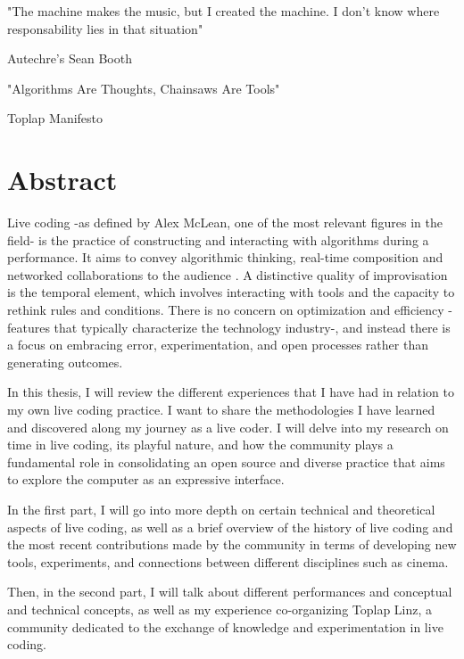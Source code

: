 \documentclass[12pt, twoside, a4paper]{report}
\begin{document}
\clearpage
{}
\setcounter{page}{1}


\newpage

\tableofcontents
\newpage
\listoffigures
\newpage

\epigraph{"The machine makes the music, but I created the machine. I don't know where responsability lies in that situation"}{Autechre's Sean Booth}
\epigraph{"Algorithms Are Thoughts, Chainsaws Are Tools"}{Toplap Manifesto}

\newpage




\chapter{Abstract}

Live coding -as defined by Alex McLean, one of the most relevant figures in the field- is the practice of constructing and
interacting with algorithms during a performance. It aims to convey algorithmic thinking, real-time composition and networked collaborations to the
audience \citep{usermanual}.
 A distinctive quality of improvisation is the temporal element, 
 which involves interacting with tools and the capacity to rethink rules and conditions.
  There is no concern on optimization and efficiency -features that typically characterize the technology industry-, 
  and instead there is a focus on embracing error, experimentation, and open processes rather than generating outcomes.

In this thesis, I will review the different experiences that I have had in relation to my own live coding practice. I want to share the methodologies I have learned and discovered along my journey as a live coder. I will delve into my research on time in live coding, its playful nature, and how the community plays a fundamental role in consolidating an open source and diverse practice that aims to explore the computer as an expressive interface.

In the first part, I will go into more depth on certain technical and theoretical aspects of live coding, as well as a brief overview of the history of live coding and the most recent contributions made by the community in terms of developing new tools, experiments, and connections between different disciplines such as cinema.

Then, in the second part, I will talk about different performances and conceptual and technical concepts, as well as my experience co-organizing Toplap Linz, a community dedicated to the exchange of knowledge and experimentation in live coding.
\end{document}

